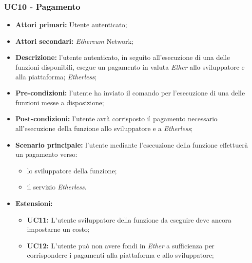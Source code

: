 \subsubsection{UC10 - Pagamento}
\begin{itemize}
	\item \textbf{Attori primari:} Utente autenticato;
	\item \textbf{Attori secondari:} \textit{Ethereum\glo} Network;
	\item \textbf{Descrizione:} l'utente autenticato, in seguito all'esecuzione di una delle funzioni disponibili, esegue un pagamento in valuta \textit{Ether\glo} allo sviluppatore e alla piattaforma; \textit{Etherless}; 
	\item \textbf{Pre-condizioni:} l'utente ha inviato il comando per l'esecuzione di una delle funzioni messe a disposizione;
	\item \textbf{Post-condizioni:} l'utente avrà corrisposto il pagamento necessario all'esecuzione della funzione allo sviluppatore e a \textit{Etherless};
	\item \textbf{Scenario principale:} l'utente mediante l'esecuzione della funzione effettuerà un pagamento verso:
	\begin{itemize}
		\item lo sviluppatore della funzione;
		\item il servizio \textit{Etherless}.
	\end{itemize}
	\item \textbf{Estensioni:} 
	\begin{itemize}
		\item \textbf{UC11:} L'utente sviluppatore della funzione da eseguire deve ancora impostarne un costo;
		\item \textbf{UC12:} L'utente può non avere fondi in \textit{Ether\glo} a sufficienza per corrispondere i pagamenti alla piattaforma e allo sviluppatore;
	\end{itemize}
\end{itemize}